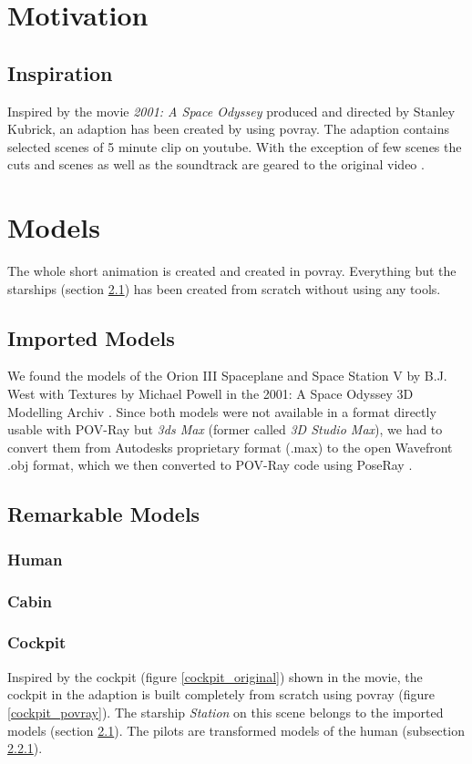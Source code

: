 
\chapter{Motivation}
\section{Inspiration}
Inspired by the movie \textit{2001: A Space Odyssey} produced and directed by Stanley Kubrick, an adaption has been created by using povray. The adaption contains selected scenes of 5 minute clip on youtube.  With the exception of few scenes the cuts and scenes as well as the soundtrack are geared to the original video  \cite{EbClectic}.

\chapter{Models}
The whole short animation is created and created in povray. Everything but the starships (section \ref{imported_models}) has been created from scratch without using any tools.

\section{Imported Models} \label{imported_models}

We found the models of the Orion III Spaceplane and Space Station V by B.J. West with Textures by Michael Powell in the 2001: A Space Odyssey 3D Modelling Archiv \cite{Archive}.
Since both models were not available in a format directly usable with POV-Ray but \textit{3ds Max} (former called \textit{3D Studio Max}), we had to convert them from Autodesks proprietary format (.max) to the open Wavefront .obj format, which we then converted to POV-Ray code using PoseRay \cite{PoseRay}.

\section{Remarkable Models}
\subsection{Human} \label{human_model}
\subsection{Cabin}
\newpage
\subsection{Cockpit} \label{cockpit_model}
Inspired by the cockpit (figure \ref{cockpit_original}) shown in the movie, the cockpit in the adaption  is built completely from scratch using povray (figure \ref{cockpit_povray}). The starship \textit{Station} on this scene belongs to the imported models (section \ref{imported_models}).
The pilots are transformed models of the human (subsection \ref{human_model}).

